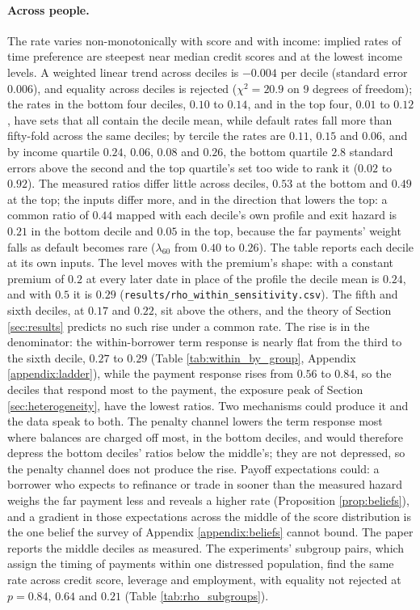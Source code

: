 \paragraph{Across people.} The rate varies non-monotonically with score and with income: implied rates of time preference are steepest near median credit scores and at the lowest income levels. A weighted linear trend across deciles is $-0.004$ per decile (standard error $0.006$), and equality across deciles is rejected ($\chi^2 = 20.9$ on 9 degrees of freedom); the rates in the bottom four deciles, $0.10$ to $0.14$, and in the top four, $0.01$ to $0.12$, have sets that all contain the decile mean, while default rates fall more than fifty-fold across the same deciles; by tercile the rates are $0.11$, $0.15$ and $0.06$, and by income quartile $0.24$, $0.06$, $0.08$ and $0.26$, the bottom quartile $2.8$ standard errors above the second and the top quartile's set too wide to rank it ($0.02$ to $0.92$). The measured ratios differ little across deciles, $0.53$ at the bottom and $0.49$ at the top; the inputs differ more, and in the direction that lowers the top: a common ratio of $0.44$ mapped with each decile's own profile and exit hazard is $0.21$ in the bottom decile and $0.05$ in the top, because the far payments' weight falls as default becomes rare ($\lambda_{60}$ from $0.40$ to $0.26$). The table reports each decile at its own inputs. The level moves with the premium's shape: with a constant premium of $0.2$ at every later date in place of the profile the decile mean is $0.24$, and with $0.5$ it is $0.29$ (\texttt{results/rho\_within\_sensitivity.csv}). The fifth and sixth deciles, at $0.17$ and $0.22$, sit above the others, and the theory of Section \ref{sec:results} predicts no such rise under a common rate. The rise is in the denominator: the within-borrower term response is nearly flat from the third to the sixth decile, $0.27$ to $0.29$ (Table \ref{tab:within_by_group}, Appendix \ref{appendix:ladder}), while the payment response rises from $0.56$ to $0.84$, so the deciles that respond most to the payment, the exposure peak of Section \ref{sec:heterogeneity}, have the lowest ratios. Two mechanisms could produce it and the data speak to both. The penalty channel lowers the term response most where balances are charged off most, in the bottom deciles, and would therefore depress the bottom deciles' ratios below the middle's; they are not depressed, so the penalty channel does not produce the rise. Payoff expectations could: a borrower who expects to refinance or trade in sooner than the measured hazard weighs the far payment less and reveals a higher rate (Proposition \ref{prop:beliefs}), and a gradient in those expectations across the middle of the score distribution is the one belief the survey of Appendix \ref{appendix:beliefs} cannot bound. The paper reports the middle deciles as measured. The experiments' subgroup pairs, which assign the timing of payments within one distressed population, find the same rate across credit score, leverage and employment, with equality not rejected at $p = 0.84$, $0.64$ and $0.21$ (Table \ref{tab:rho_subgroups}).

